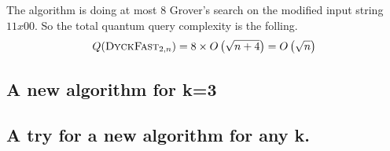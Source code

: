 \begin{tproof}
    The algorithm is doing at most 8 Grover's search on the modified input string $11x00$.
    So the total quantum query complexity is the folling.
    \[Q(\textsc{DyckFast}_{2, n}) = 8\times O\left(\sqrt{n+4}\right) = O\left(\sqrt{n}\right)\]
\end{tproof}

\subsection{A new algorithm for k=3}

\subsection{A try for a new algorithm for any k.}
